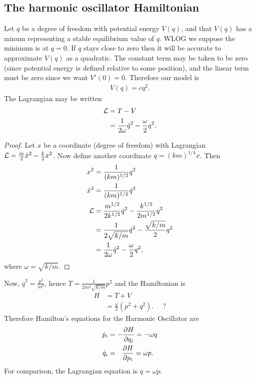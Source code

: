\subsection*{The harmonic oscillator Hamiltonian}

Let $q$ be a degree of freedom with potential energy $V(q)$, and that $V(q)$ has a minum representing a stable
equilibrium value of $q$. WLOG we suppose the minimum is at $q=0$. If $q$ stays close to zero then it will be
accurate to approximate $V(q)$ as a quadratic. The constant term may be taken to be zero (since potential
energy is defined relative to some position), and the linear term must be zero since we want $V'(0) = 0$.
Therefore our model is
\begin{align*}
  V(q) = cq^2.
\end{align*}
The Lagrangian may be written
\begin{align*}
  \mathcal{L}
  &= T - V \\
  &= \frac{1}{2\omega}\dot{q}^2 - \frac{\omega}{2}q^2.
\end{align*}
\begin{proof}
  Let $x$ be a coordinate (degree of freedom) with Lagrangian $\mathcal{L} = \frac{m}{2}\dot{x}^2 - \frac{k}{2}x^2$.
  Now define another coordinate $q = (km)^{1/4}x$. Then
  \begin{align*}
    x^2 &= \frac{1}{(km)^{1/2}}q^2 \\
    \dot{x}^2 &= \frac{1}{(km)^{1/2}}\dot{q}^2 \\
    \mathcal{L} &= \frac{m^{1/2}}{2k^{1/2}}\dot{q}^2 - \frac{k^{1/2}}{2m^{1/2}}q^2 \\
    &= \frac{1}{2\sqrt{k/m}}\dot{q}^2 - \frac{\sqrt{k/m}}{2}q^2 \\
    &= \frac{1}{2\omega}\dot{q}^2 - \frac{\omega}{2}q^2,
  \end{align*}
where $\omega = \sqrt{k/m}$.
 \end{proof}

Now, $\dot{q}^2 = \frac{p^2}{m^2}$, hence $T = \frac{1}{2m^2\sqrt{k/m}}p^2$ and the Hamiltonian is
\begin{align*}
  H
  &= T + V \\
  &= \frac{\omega}{2}(p^2 + q^2). ~~~~~~?
\end{align*}
Therefore Hamilton's equations for the Harmonic Oscillator are
\begin{align*}
  \dot{p}_i &= -\frac{\partial H}{\partial q_i} = -\omega q \\
  \dot{q}_i &= ~~\frac{\partial H}{\partial p_i} = \omega p.
\end{align*}
For comparison, the Lagrangian equation is $\ddot{q} = \omega \dot{p}$.

